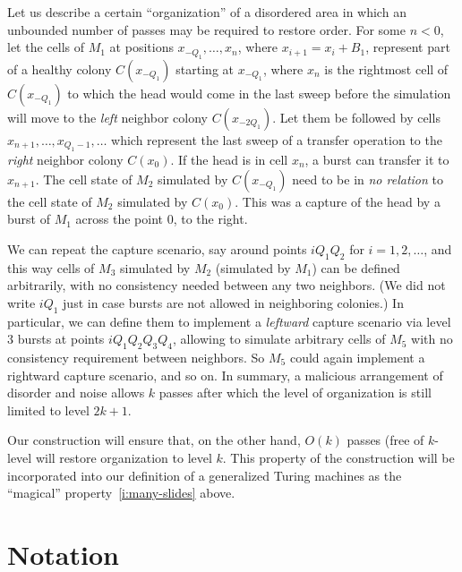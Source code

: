 \documentclass[11pt]{memoir}
\theoremstyle{definition} %
\def\B{B}
\newcommand{\Q}{Q}
\begin{document}
\begin{example}\label{xpl:unbounded}
  Let us describe a certain ``organization'' of a disordered area in which an unbounded number of passes
  may be required to restore order.
For some \( n<0 \), let the cells of \( M_{1} \) at positions
\( x_{-\Q_{1}},\dots,x_{n} \), where \( x_{i+1}=x_{i}+\B_{1} \),
represent part of a healthy colony \( C(x_{-\Q_{1}}) \) starting at \( x_{-\Q_{1}} \), where \( x_{n} \)
is the rightmost cell of \( C(x_{-\Q_{1}}) \)
to which the head would come in the last sweep before
the simulation will move to the \emph{left} neighbor colony \( C(x_{-2\Q_{1}}) \).
Let them be followed by cells \( x_{n+1},\dots, x_{\Q_{1}-1},\dots\)
which represent the last sweep of a transfer operation to the \emph{right} neighbor colony \( C(x_{0}) \).
If the head is in cell \( x_{n} \), a burst can transfer it to \( x_{n+1} \).
The cell state of \( M_{2} \) simulated by \( C(x_{-\Q_{1}}) \) need to be in \emph{no relation} to 
the cell state of \( M_{2} \) simulated by \( C(x_{0}) \).
This was a capture of the head by a burst of \( M_{1} \) across the point 0, to the right.

We can repeat the capture scenario, say around points \( i \Q_{1}\Q_{2} \) for \( i=1,2,\dots \),
and this way cells of \( M_{3} \) simulated by \( M_{2} \) (simulated by \( M_{1} \))
can be defined arbitrarily, with no consistency needed between any two neighbors.
(We did not write \( i \Q_{1} \) just in case bursts are not allowed in neighboring colonies.)
In particular, we can define them to implement a \emph{leftward} capture scenario
via level 3 bursts at points \( i \Q_{1}\Q_{2}\Q_{3}\Q_{4} \), allowing to simulate arbitrary cells of \( M_{5} \)
with no consistency requirement between neighbors.
So \( M_{5} \) could again implement a rightward capture scenario, and so on.
In summary, a malicious arrangement of disorder and noise allows \( k \) passes
after which the level of organization is still limited to level \( 2 k + 1 \).
\end{example}

Our construction will ensure that, on the other hand,
\( O(k) \) passes (free of \( k \)-level will restore organization to level \( k \).
This property of the construction will be incorporated into our definition of a generalized
Turing machines as the ``magical'' property~\eqref{i:many-slides} above.


\section{Notation}\label{sec:notation}
\end{document}
